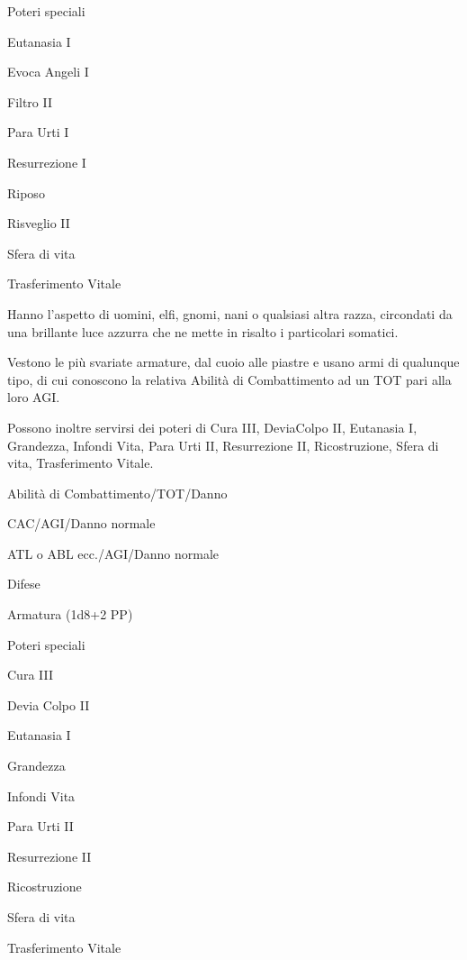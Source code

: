 \begin{parmostro}{Poteri speciali}
\item Eutanasia I
\item Evoca Angeli I
\item Filtro II
\item Para Urti I
\item Resurrezione I
\item Riposo
\item Risveglio II
\item Sfera di vita
\item Trasferimento Vitale
\end{parmostro}


Hanno l'aspetto di uomini, elfi, gnomi, nani o qualsiasi altra razza,
circondati da una brillante luce azzurra che ne mette in risalto i
particolari somatici.  

Vestono le pi\`u svariate armature, dal cuoio
alle piastre e usano armi di qualunque tipo, di cui conoscono la
relativa Abilit\`a di Combattimento ad un TOT pari alla loro AGI.

Possono inoltre servirsi dei poteri di Cura III, DeviaColpo II,
Eutanasia I, Grandezza, Infondi Vita, Para Urti II, Resurrezione II,
Ricostruzione, Sfera di vita, Trasferimento Vitale. 


\begin{parmostro}{Abilit\`a di Combattimento/TOT/Danno}
\item CAC/AGI/Danno normale
\item ATL o ABL ecc./AGI/Danno normale
\end{parmostro}

\begin{parmostro}{Difese}
\item Armatura (1d8+2 PP)
\end{parmostro}

\begin{parmostro}{Poteri speciali}
\item Cura III
\item Devia Colpo II
\item Eutanasia I
\item Grandezza
\item Infondi Vita
\item Para Urti II
\item Resurrezione II
\item Ricostruzione
\item Sfera di vita
\item Trasferimento Vitale
\end{parmostro}

